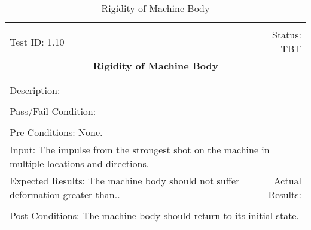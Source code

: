 \documentclass[titlepage]{article}
\begin{document}
\begin{center}%
\begin{table}
\begin{tabular}{|l r|}\hline&\\[-2mm]
	Test ID: 1.10	&Status: TBT\\[-3mm]
	\multicolumn{2}{|c|}{\textbf{\large{Rigidity of Machine Body}}}\\&\\\hline&\\[-3mm]
	\multicolumn{2}{|p{\textwidth}|}{Description: }\\[1mm]\hline&\\[-3mm]%
	\multicolumn{2}{|p{\textwidth}|}{Pass/Fail Condition: }\\[1mm]\hline&\\[-3mm]
	\multicolumn{2}{|p{\textwidth}|}{Pre-Conditions: None.}\\[4mm]
	\multicolumn{2}{|p{\textwidth}|}{Input: The impulse from the strongest shot on the machine in multiple locations and directions.}\\[2mm]\hline
	\multicolumn{1}{|p{0.49\textwidth}}{Expected Results: The machine body should not suffer deformation greater than..}	&\multicolumn{1}{|p{0.45\textwidth}|}{Actual Results:}\\\hline&\\[-3mm]%
	\multicolumn{2}{|p{\textwidth}|}{Post-Conditions: The machine body should return to its initial state.}\\\hline
\end{tabular}
\caption{Rigidity of Machine Body}
\end{table}
\end{center}
\end{document}
